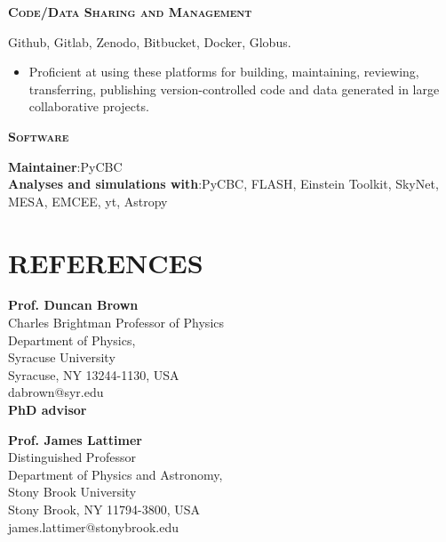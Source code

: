 \textsc{\textbf{Code/Data Sharing and Management}}
\begin{addmargin}[2em]{2em}
{Github, Gitlab, Zenodo, Bitbucket, Docker, Globus.
\begin{itemize}
\renewcommand{\labelitemi}{-}
\vspace{-2mm}
\item Proficient at using these platforms for building, maintaining, reviewing, transferring, publishing version-controlled code and data generated in large collaborative projects.
\end{itemize}
}
\end{addmargin}

\textsc{\textbf{Software}}
\begin{addmargin}[2em]{2em}
{\textbf{Maintainer}:\hspace{1.5ex}}{PyCBC} \\
{\textbf{Analyses and simulations with}:\hspace{1.5ex}}{PyCBC, FLASH, Einstein Toolkit, SkyNet, MESA, EMCEE, yt, Astropy}
\end{addmargin}
\vspace{2mm}

\vspace{2mm}
\section{REFERENCES}
\vspace{1mm}
\begin{addmargin}[-1em]{}
\begin{itemize}
\renewcommand{\labelitemi}{~}
  \begin{minipage}{0.6\textwidth}
    \renewcommand{\labelitemi}{~}
    \item \textbf{Prof. Duncan Brown}\\
    Charles Brightman Professor of Physics \\
    Department of Physics, \\
    Syracuse University \\
    Syracuse, NY 13244-1130, USA \\
    dabrown@syr.edu \\
    \textbf{PhD advisor}
  \end{minipage}
  \begin{minipage}{0.5\textwidth}
   \renewcommand{\labelitemi}{~}
    \item \textbf{Prof. James Lattimer}\\
    Distinguished Professor \\
    Department of Physics and Astronomy, \\
    Stony Brook University \\
    Stony Brook, NY 11794-3800, USA \\
    james.lattimer@stonybrook.edu \\
  \end{minipage}
\end{itemize}
\end{addmargin}

